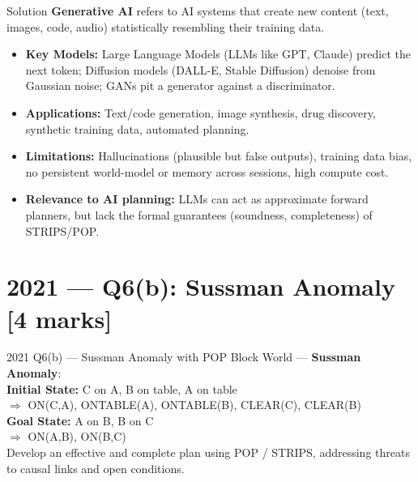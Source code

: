 \documentclass[12pt,a4paper]{article}
\begin{document}
\begin{solbox}{Solution}
\textbf{Generative AI} refers to AI systems that create new content (text, images, code,
audio) statistically resembling their training data.

\begin{itemize}[noitemsep]
  \item \textbf{Key Models:} Large Language Models (LLMs like GPT, Claude) predict the
    next token; Diffusion models (DALL-E, Stable Diffusion) denoise from Gaussian noise;
    GANs pit a generator against a discriminator.
  \item \textbf{Applications:} Text/code generation, image synthesis, drug discovery,
    synthetic training data, automated planning.
  \item \textbf{Limitations:} Hallucinations (plausible but false outputs), training data
    bias, no persistent world-model or memory across sessions, high compute cost.
  \item \textbf{Relevance to AI planning:} LLMs can act as approximate forward planners,
    but lack the formal guarantees (soundness, completeness) of STRIPS/POP.
\end{itemize}
\end{solbox}

\newpage

\section{2021 --- Q6(b): Sussman Anomaly [4 marks]}

\begin{qbox}{2021 Q6(b) --- Sussman Anomaly with POP}
Block World --- \textbf{Sussman Anomaly}:\\[4pt]
\textbf{Initial State:} C on A, B on table, A on table\\
\phantom{xxxxxx}$\Rightarrow$ ON(C,A), ONTABLE(A), ONTABLE(B), CLEAR(C), CLEAR(B)\\[4pt]
\textbf{Goal State:} A on B, B on C\\
\phantom{xxxxxx}$\Rightarrow$ ON(A,B), ON(B,C)\\[4pt]
Develop an effective and complete plan using POP / STRIPS,
addressing threats to causal links and open conditions.
\end{qbox}
\end{document}
